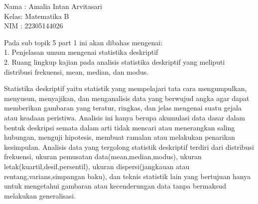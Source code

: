 \documentclass[a4paper,10pt]{article}
\begin{document}
\begin{eulernotebook}
\begin{eulercomment}
Nama : Amalia Intan Arvitasari\\
Kelas: Matematika B\\
NIM  : 22305144026

\end{eulercomment}
\begin{eulercomment}
Pada sub topik 5 part 1 ini akan dibahas mengenai:\\
1. Penjelasan umum mengenai statistika deskriptif\\
2. Ruang lingkup kajian pada analisis statistika deskriptif yang
meliputi distribusi frekuensi, mean, median, dan modus.

\end{eulercomment}
\begin{eulercomment}
Statistika deskriptif yaitu statistik yang mempelajari tata cara
mengumpulkan, menyusun, menyajikan, dan menganalisis data yang
berwujud angka agar dapat memberikan gambaran yang teratur, ringkas,
dan jelas mengenai suatu gejala atau keadaan peristiwa. Analisis ini
hanya berupa akumulasi data dasar dalam bentuk deskripsi semata dalam
arti tidak mencari atau menerangkan saling hubungan, menguji
hipotesis, membuat ramalan atau melakukan penarikan kesimpulan.
Analisis data yang tergolong statistik deskriptif terdiri dari
distribusi frekuensi, ukuran pemusatan data(mean,median,modus), ukuran
letak(kuartil,desil,persentil), ukuran dispersi(jangkauan atau
rentang,varians,simpangan baku), dan teknis statistik lain yang
bertujuan hanya untuk mengetahui gambaran atau kecenderungan data
tanpa bermaksud melakukan generalisasi.


\end{eulercomment}
\end{eulernotebook}
\end{document}
